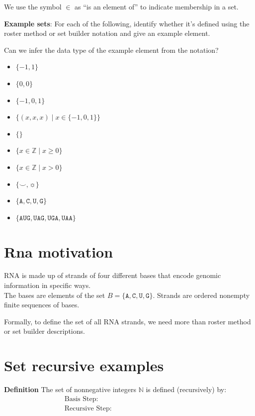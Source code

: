 \documentclass[12pt, oneside]{article}
\newcommand{\A}[0]{\texttt{A}}
\newcommand{\C}[0]{\texttt{C}}
\newcommand{\G}[0]{\texttt{G}}
\newcommand{\U}[0]{\texttt{U}}
\begin{document}
\vfill

We use the symbol $\in$ as ``is an element of'' to indicate membership in a set.\\

\newpage 

{\bf Example sets}: For each of the following, identify whether it's defined using the roster method
or set builder notation and give an example element.

Can we infer the data type of the example element from the notation?

\begin{itemize}
    \item[]$\{ -1, 1\}$
    \vfill
    \item[]$\{0, 0 \}$
    \vfill
    \item[]$\{-1, 0, 1 \}$
    \vfill
    \item[]$\{(x,x,x) \mid x \in \{-1,0,1\} \}$
    \vfill
    \item[]$\{ \}$
    \vfill
    \item[]$\{ x \in \mathbb{Z} \mid x \geq 0 \}$
    \vfill
    \item[]$\{ x \in \mathbb{Z}  \mid x > 0 \}$
    \vfill
    \item[]$\{ \smile, \sun \}$
    \vfill
    \item[]$\{\A,\C,\U,\G\}$
    \vfill
    \item[]$\{\A\U\G, \U\A\G, \U\G\A, \U\A\A \}$
    \vfill
\end{itemize}
 \vfill
\section*{Rna motivation}


RNA is made up of strands of four different bases that encode genomic information
in specific ways.\\
The bases are elements of the set 
$B  = \{\A, \C, \U, \G \}$.
Strands are ordered nonempty finite sequences of bases.

Formally, to define the set of all RNA strands, we need more than roster
method or set builder descriptions. 

 \vfill
\section*{Set recursive examples}


{\bf Definition} The set of nonnegative integers $\mathbb{N}$ is defined (recursively) by: 
\[
\begin{array}{ll}
\textrm{Basis Step: } & \phantom{0 \in \mathbb{N}} \\
\textrm{Recursive Step: } & \phantom{\textrm{If } n \in \mathbb{N} \textrm{, then } n+1 \in \mathbb{N}}
\end{array}
\]
\end{document}

